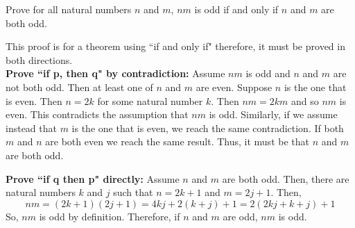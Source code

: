 \documentclass[12pt,addpoints]{exam}
\begin{document}
\begin{questions}
\question Prove for all natural numbers $n$ and $m$, $nm$ is odd if
and only if $n$ and $m$ are both odd.
    \ifprintanswers
        \vspace{-10pt}
    \fi
\begin{solution}
     This proof is for a theorem using ``if and only if" therefore,
     it must be proved in both directions.  \\
    \textbf{Prove ``if p, then q" by contradiction:} Assume $nm$ is
    odd and $n$ and $m$ are not both odd.  Then at least one of $n$
    and $m$ are even.  Suppose $n$ is the one that is even. Then
    $n=2k$ for some natural number $k$.  Then $nm = 2km$ and so $nm$
    is even.  This contradicts the assumption that $nm$ is odd.
    Similarly, if we assume instead that $m$ is the one that is even,
    we reach the same contradiction.   If both $m$ and $n$ are both
    even we reach the same result.  Thus, it must be that $n$ and
    $m$ are both odd.

    \smallskip
    \textbf{Prove ``if q then p" directly:} Assume $n$ and $m$ are
    both odd.  Then, there are natural numbers $k$ and $j$ such
    that $n = 2k+1$ and $m=2j+1$.  Then,
    \[ nm = (2k+1)(2j+1) = 4kj + 2(k+j) +1 = 2(2kj +k + j) +1 \]
    So, $nm$ is odd by definition. Therefore, if $n$ and $m$ are
    odd, $nm$ is odd.
\end{solution}



\end{questions}
\end{document}
